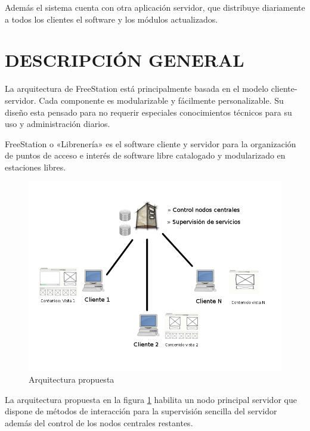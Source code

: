 Además el sistema cuenta con otra aplicación servidor, que distribuye
diariamente a todos los clientes el software y los módulos actualizados.

\section{\uppercase{Descripción general}}

La arquitectura de FreeStation está principalmente basada en el modelo
cliente-servidor. Cada componente es modularizable y fácilmente
personalizable. Su diseño esta pensado para no requerir especiales
conocimientos técnicos para su uso y administración diarios.

FreeStation o «Librenería» es el software cliente y servidor para
la organización de puntos de acceso e interés de software libre catalogado y
modularizado en estaciones libres.

\begin{figure}[ht]
    \begin{center}
        \includegraphics[scale=0.5]{src/img/infraestructure.png}
        \caption[Arquitectura propuesta]
          {Arquitectura propuesta}
          \label{arquitectura}
    \end{center}
\end{figure}

La arquitectura propuesta en la figura \ref{arquitectura} habilita un nodo principal
servidor que dispone de métodos de interacción para la supervisión sencilla del servidor
además del control de los nodos centrales restantes.
\newpage

